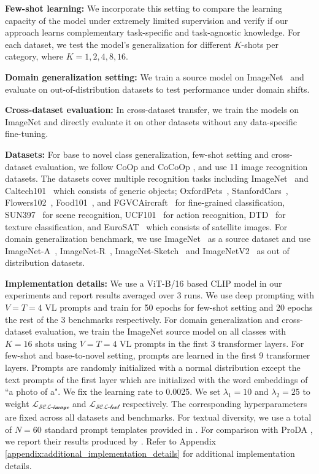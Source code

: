 \documentclass[10pt,twocolumn,letterpaper]{article}
\begin{document}
\noindent \textbf{Few-shot learning:} We incorporate this setting to compare the learning capacity of the model under extremely limited supervision and verify if our approach learns {complementary} task-specific and task-agnostic knowledge. For each dataset, we test the model's generalization for different $K$-shots per category, where $K = 1, 2, 4, 8, 16$.  

\noindent \textbf{Domain generalization setting:} We train a source model on ImageNet~\cite{deng2009imagenet} and evaluate on out-of-distribution datasets to test performance under domain shifts. 

\noindent \textbf{Cross-dataset evaluation:} In cross-dataset transfer, we train the models on ImageNet \cite{deng2009imagenet} and directly evaluate it on other datasets without any data-specific fine-tuning. 

\noindent \textbf{Datasets:} For base to novel class generalization, few-shot setting and cross-dataset evaluation, we follow CoOp \cite{zhou2022learning} and CoCoOp \cite{zhou2022conditional}, and use 11 image recognition datasets. The datasets cover multiple recognition tasks including ImageNet~\cite{deng2009imagenet} and Caltech101~\cite{fei2004learning} which consists of generic objects; OxfordPets~\cite{parkhi2012cats}, StanfordCars~\cite{krause20133d}, Flowers102~\cite{nilsback2008automated}, Food101~\cite{bossard2014food}, and FGVCAircraft~\cite{maji2013fine} for fine-grained classification, SUN397~\cite{xiao2010sun} for scene recognition, UCF101~\cite{soomro2012ucf101} for action recognition, DTD~\cite{cimpoi2014describing} for texture classification, and EuroSAT~\cite{helber2019eurosat} which consists of satellite images. For domain generalization benchmark, we use ImageNet~\cite{deng2009imagenet} as a source dataset and use ImageNet-A~\cite{hendrycks2021natural}, ImageNet-R~\cite{hendrycks2021many}, ImageNet-Sketch~\cite{wang2019learning} and ImageNetV2~\cite{recht2019imagenet} as out of distribution datasets.

\noindent \textbf{Implementation details:} We use a ViT-B/16 based CLIP model in our experiments and report results averaged over 3 runs. We use deep prompting with $V=T=4$ VL prompts and train for 50 epochs for few-shot setting and 20 epochs the rest of the 3 benchmarks respectively.  For domain generalization and cross-dataset evaluation, we train the ImageNet source model on all classes with $K=16$ shots using $V=T=4$ VL prompts in the first 3 transformer layers. For few-shot and base-to-novel setting, prompts are learned in the first 9 transformer layers. Prompts are randomly initialized with a normal distribution except the text prompts of the first layer which are initialized with the word embeddings of ``a photo of a". We fix the learning rate to 0.0025. We set $\lambda_{1}=10$ and $\lambda_{2}=25$ to weight $\mathcal{L_{\text{SCL-image}}}$ and $\mathcal{L_{\text{SCL-text}}}$ respectively. The corresponding hyperparameters are fixed across all datasets and benchmarks. For textual diversity, we use a total of $N=60$ standard prompt templates provided in \cite{radford2021learning}. For comparison with ProDA \cite{lu2022prompt}, we report their results produced by \cite{derakhshani2022variational}. Refer to Appendix \ref{appendix:additional_implementation_details} for additional implementation details.
\end{document}
